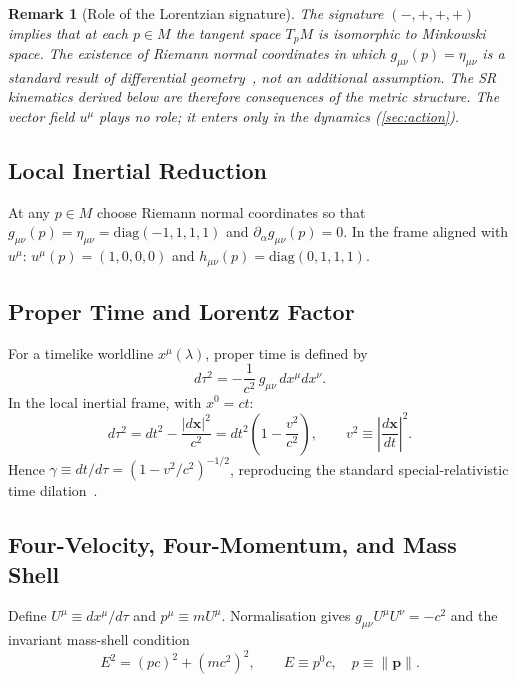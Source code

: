 \documentclass[12pt,a4paper]{article}
\newtheorem{remark}{Remark}
\begin{document}
\begin{remark}[Role of the Lorentzian signature]
The signature $(-,+,+,+)$ implies that at each $p\in M$ the tangent space
$T_{p}M$ is isomorphic to Minkowski space. The existence of Riemann normal
coordinates in which $g_{\mu\nu}(p)=\eta_{\mu\nu}$ is a standard result of
differential geometry~\citep{misner1973,carroll2004}, not an additional
assumption. The SR kinematics derived below are therefore \emph{consequences
of the metric structure}. The vector field $u^{\mu}$ plays no role; it enters
only in the dynamics (\cref{sec:action}).
\end{remark}

\subsection{Local Inertial Reduction}

At any $p\in M$ choose Riemann normal coordinates so that
$g_{\mu\nu}(p)=\eta_{\mu\nu}=\mathrm{diag}(-1,1,1,1)$ and
$\partial_{\alpha}g_{\mu\nu}(p)=0$. In the frame aligned with $u^{\mu}$:
$u^{\mu}(p)=(1,0,0,0)$ and $h_{\mu\nu}(p)=\mathrm{diag}(0,1,1,1)$.

\subsection{Proper Time and Lorentz Factor}

For a timelike worldline $x^{\mu}(\lambda)$, proper time is defined by
\begin{equation}
  d\tau^{2}=-\frac{1}{c^{2}}\,g_{\mu\nu}\,dx^{\mu}dx^{\nu}.
\end{equation}
In the local inertial frame, with $x^{0}=ct$:
\begin{equation}
  d\tau^{2}=dt^{2}-\frac{|d\mathbf{x}|^{2}}{c^{2}}
           =dt^{2}\!\left(1-\frac{v^{2}}{c^{2}}\right),
  \qquad v^{2}\equiv\left|\frac{d\mathbf{x}}{dt}\right|^{2}.
\end{equation}
Hence $\gamma\equiv dt/d\tau=(1-v^{2}/c^{2})^{-1/2}$, reproducing the
standard special-relativistic time dilation~\citep{will2014,carroll2004}.

\subsection{Four-Velocity, Four-Momentum, and Mass Shell}

Define $U^{\mu}\equiv dx^{\mu}/d\tau$ and $p^{\mu}\equiv mU^{\mu}$.
Normalisation gives $g_{\mu\nu}U^{\mu}U^{\nu}=-c^{2}$ and the invariant
mass-shell condition
\begin{equation}
  E^{2}=(pc)^{2}+(mc^{2})^{2},\qquad E\equiv p^{0}c,\quad p\equiv\|\mathbf{p}\|.
  \label{eq:massshell}
\end{equation}
\end{document}
